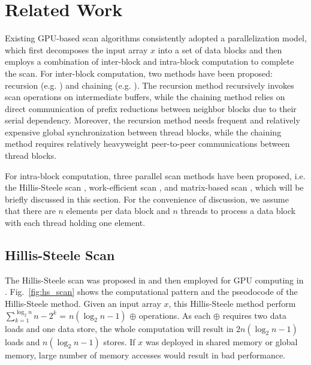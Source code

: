 \documentclass[article]{elsarticle}
\begin{document}
{\section{Related Work}
\label{sec:related_work}
Existing GPU-based scan algorithms consistently adopted a parallelization model, which first decomposes the input array $x$ into a set of data blocks and then employs a combination of inter-block and intra-block computation to complete the scan. For inter-block computation, two methods have been proposed: recursion (e.g. \cite{dotsenko2008fast}) and chaining (e.g. \cite{yan2013streamscan}). The recursion method recursively invokes scan operations on intermediate buffers, while the chaining method relies on direct communication of prefix reductions between neighbor blocks due to their serial dependency. Moreover, the recursion method needs frequent and relatively expensive global synchronization between thread blocks, while the chaining method requires relatively heavyweight peer-to-peer communications between thread blocks.

For intra-block computation, three parallel scan methods have been proposed, i.e. the Hillis-Steele scan \cite{hillis1986data}, work-efficient scan \cite{harris2007parallel}, and matrix-based scan \cite{dotsenko2008fast}, which will be briefly discussed in this section. For the convenience of discussion, we assume that there are $n$ elements per data block and $n$ threads to process a data block with each thread holding one element.
\subsection{Hillis-Steele Scan}
\label{sec:hs_scan}
The Hillis-Steele scan was proposed in \cite{hillis1986data} and then employed for GPU computing in \cite{horn2005stream}. Fig.~\ref{fig:hs_scan} shows the computational pattern and the pseodocode of the Hillis-Steele method. Given an input array $x$, this Hillis-Steele method perform \mbox{$\sum_{k=1}^{\log_2n}n-2^k$} = \mbox{$n(\log_2n-1)$} $\oplus$ operations. As each $\oplus$ requires two data loads and one data store, the whole computation will result in \mbox{$2n(\log_2n-1)$} loads and \mbox{$n(\log_2n-1)$} stores. If $x$ was deployed in shared memory or global memory, large number of memory accesses would result in bad performance.
\newcommand{\hsscankernel}{
\begin{algorithmic}[1]
\fontsize{8pt}{8.05pt}\selectfont
\Procedure{Hillis\_Steele\_scan}{$x$, $n$, $\oplus$}
    \For{$k$=0; $k <\log_2n$; ++$k$}
    	\ForAll{$0\leq i < n$ in parallel}
        	\If{$i\ge 2^k$}
            	\State $x_i$ = $x_i \oplus x_{i-2^k}$;
            \EndIf
        \EndFor
    \EndFor
\EndProcedure
\end{algorithmic}}

}
\end{document}
